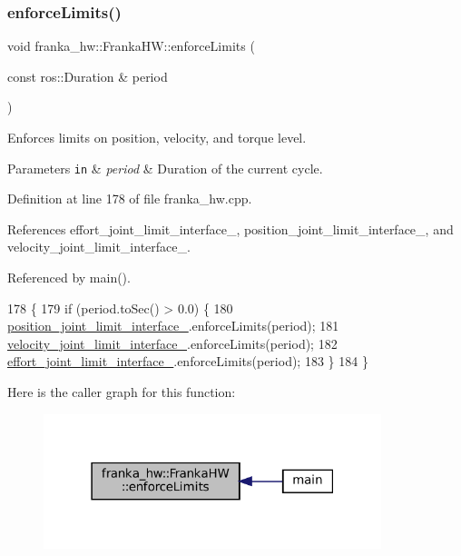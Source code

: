 \subsubsection{\texorpdfstring{enforce\+Limits()}{enforceLimits()}}
{\footnotesize\ttfamily void franka\+\_\+hw\+::\+Franka\+H\+W\+::enforce\+Limits (\begin{DoxyParamCaption}\item[{const ros\+::\+Duration \&}]{period }\end{DoxyParamCaption})}

Enforces limits on position, velocity, and torque level.


\begin{DoxyParams}[1]{Parameters}
\mbox{\tt in}  & {\em period} & Duration of the current cycle. \\
\hline
\end{DoxyParams}


Definition at line 178 of file franka\+\_\+hw.\+cpp.



References effort\+\_\+joint\+\_\+limit\+\_\+interface\+\_\+, position\+\_\+joint\+\_\+limit\+\_\+interface\+\_\+, and velocity\+\_\+joint\+\_\+limit\+\_\+interface\+\_\+.



Referenced by main().


\begin{DoxyCode}
178                                                       \{
179   \textcolor{keywordflow}{if} (period.toSec() > 0.0) \{
180     \hyperlink{classfranka__hw_1_1FrankaHW_a0453d8d00992ae08ddd47083a21abcc8}{position\_joint\_limit\_interface\_}.enforceLimits(period);
181     \hyperlink{classfranka__hw_1_1FrankaHW_a4e85e4440436f97a169553d281049e4e}{velocity\_joint\_limit\_interface\_}.enforceLimits(period);
182     \hyperlink{classfranka__hw_1_1FrankaHW_a3545598adde92a2cd78af121bf40f24b}{effort\_joint\_limit\_interface\_}.enforceLimits(period);
183   \}
184 \}
\end{DoxyCode}
Here is the caller graph for this function\+:
\nopagebreak
\begin{figure}[H]
\begin{center}
\leavevmode
\includegraphics[width=279pt]{classfranka__hw_1_1FrankaHW_afb0f49fec764be80e4c89e29706a4936_icgraph}
\end{center}
\end{figure}
\mbox{\label{classfranka__hw_1_1FrankaHW_ae8063f56d7e70e0f7537fe1d522f8f2f}} 
